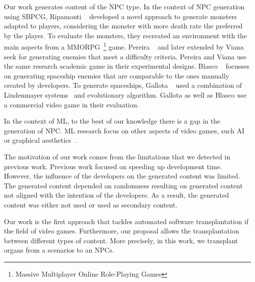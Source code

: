 Our work generates content of the NPC type. In the context of NPC generation using SBPCG, Ripamonti \etal~\cite{ripamonti2021dragon} developed a novel approach to generate monsters adapted to players, considering the monster with more death rate the preferred by the player. To evaluate the monsters, they recreated an environment with the main aspects from a MMORPG~\footnote{Massive Multiplayer Online Role-Playing Games} game. Pereira \etal~\cite{pereira2021procedural_enemies} and later extended by Viana \etal~\cite{viana2022illuminating} seek for generating enemies that meet a difficulty criteria. Pereira \etal and Viana \etal use the same research academic game in their experimental designs. 
Blasco \etal~\cite{blasco2021evolutionary} focusses on generating spaceship enemies that are comparable to the ones manually created by developers. To generate spaceships, Gallota \etal~\cite{gallotta2022evolving} used a combination of Lindenmayer systems~\cite{lindenmayer1968mathematical} and evolutionary algorithm. Gallota \etal as well as Blasco \etal use a commercial video game in their evaluation.

In the context of ML, to the best of our knowledge there is a gap in the generation of NPC. ML research focus on other aspects of video games, such AI~\cite{brocchini2022monster} or graphical aesthetics~\cite{li2020automatic}.

The motivation of our work comes from the limitations that we detected in previous work. Previous work focused on speeding up development time. However, the influence of the developers on the generated content was limited. The generated content depended on randomness resulting on generated content not aligned with the intention of the developers. As a result, the generated content was either not used or used as secondary content. 

Our work is the first approach that tackles automated software transplantation if the field of video games. Furthermore, our proposal allows the transplantation between different types of content. More precisely, in this work, we transplant organs from a scenarios to an NPCs.


